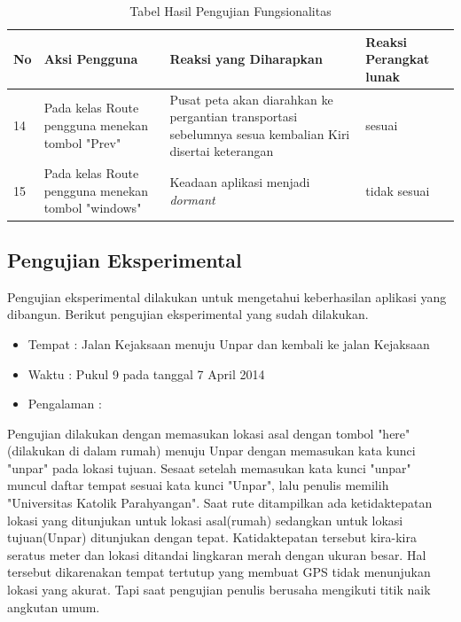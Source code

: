 \begin{table}[h!]
	\centering
		\begin{tabular}{|p{1cm}|p{4cm}|p{6cm}|p{3cm}|}\hline
				No & Aksi Pengguna & Reaksi yang Diharapkan & Reaksi Perangkat lunak \\ \hline
				14 & Pada kelas Route pengguna menekan tombol "Prev" & Pusat peta akan diarahkan ke pergantian transportasi sebelumnya sesua kembalian Kiri disertai keterangan & sesuai \\ \hline
				15 & Pada kelas Route pengguna menekan tombol "windows" & Keadaan aplikasi menjadi \textit{dormant} & tidak sesuai \\ \hline
		\end{tabular}
	\caption{Tabel Hasil Pengujian Fungsionalitas}
	\label{tab:TabelHasilPengujianFungsionalitas}
\end{table}
\fi


\subsection{Pengujian Eksperimental}
\label{lab:Pengujian Eksperimental}
\hspace{0.5cm} Pengujian eksperimental dilakukan untuk mengetahui keberhasilan aplikasi yang dibangun. Berikut pengujian eksperimental yang sudah dilakukan.

		\begin{itemize}
			\item Tempat : Jalan Kejaksaan menuju Unpar dan kembali ke jalan Kejaksaan
			\item Waktu : Pukul 9 pada tanggal 7 April 2014 
			\item Pengalaman : 
		\end{itemize}
			\hspace{0.5cm} Pengujian dilakukan dengan memasukan lokasi asal dengan tombol "here" (dilakukan di dalam rumah) menuju Unpar dengan memasukan kata kunci "unpar" pada lokasi tujuan. Sesaat setelah memasukan kata kunci "unpar" muncul daftar tempat sesuai kata kunci "Unpar", lalu penulis memilih "Universitas Katolik Parahyangan". Saat rute ditampilkan ada ketidaktepatan lokasi yang ditunjukan untuk lokasi asal(rumah) sedangkan untuk lokasi tujuan(Unpar) ditunjukan dengan tepat. Katidaktepatan tersebut kira-kira seratus meter dan lokasi ditandai lingkaran merah dengan ukuran besar. Hal tersebut dikarenakan tempat tertutup yang membuat GPS tidak menunjukan lokasi yang akurat. Tapi saat pengujian penulis berusaha mengikuti titik naik angkutan umum.
			
